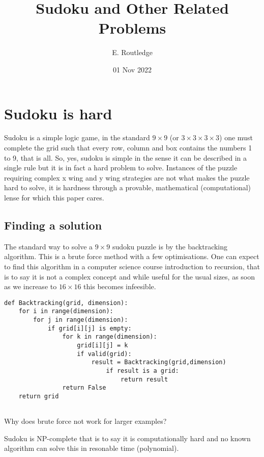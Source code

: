 \documentclass[a4paper,12pt]{article}
\author{E. Routledge}
\date{01 Nov 2022}
\title{Sudoku and Other Related Problems}
\begin{document}
\lstset{language=Python}
\maketitle

\section{Sudoku is hard}

Sudoku is a simple logic game, in the standard $9 \times 9$ (or $3 \times 3 \times 3 \times 3$) 
one must complete the grid such that every row, column and box contains the numbers 1 to 9, that is all. 
So, yes, sudoku is simple in the sense it can be described in a single rule but it is in fact a hard problem to solve.
Instances of the puzzle requiring complex x wing and y wing strategies are not what makes the puzzle hard to solve,
it is hardness through a provable, mathematical (computational) lense for which this paper cares. 

\subsection{Finding a solution}
The standard way to solve a $9 \times 9$ sudoku puzzle is by the backtracking algorithm. 
This is a brute force method with a few optimisations.
One can expect to find this algorithm in a computer science course introduction to recursion, that is to say it is not a complex concept 
and while useful for the usual sizes, as soon as we increase to $16 \times 16$ this becomes infeesible.

\begin{lstlisting}[caption=Backtracking]
def Backtracking(grid, dimension):
    for i in range(dimension):
        for j in range(dimension):
            if grid[i][j] is empty:
                for k in range(dimension):
                    grid[i][j] = k
                    if valid(grid):
                        result = Backtracking(grid,dimension)
                            if result is a grid:
                                return result
                return False
    return grid
				
\end{lstlisting}

Why does brute force not work for larger examples?

Sudoku is NP-complete that is to say it is computationally hard and no known algorithm
can solve this in resonable time (polynomial). 
\end{document}
